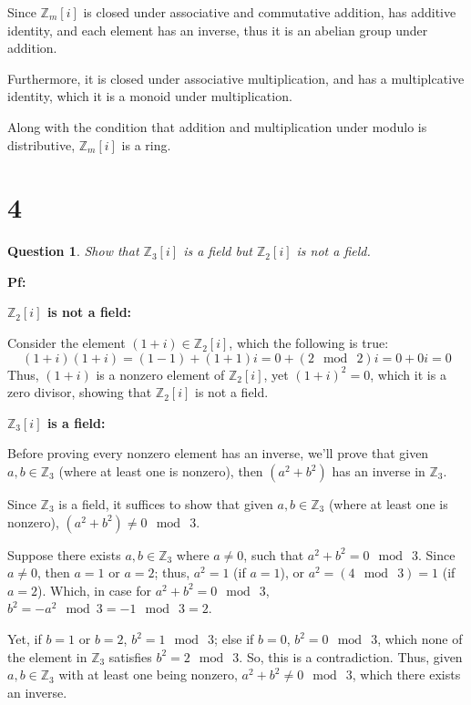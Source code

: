 \documentclass{article}
\newtheorem{question}{Question}
\begin{document}
Since $\mathbb{Z}_m[i]$ is closed under associative and commutative addition, has additive identity, and each element has an inverse,
thus it is an abelian group under addition.

Furthermore, it is closed under associative multiplication, and has a multiplcative identity, which it is a monoid under multiplication.

Along with the condition that addition and multiplication under modulo is distributive, $\mathbb{Z}_m[i]$ is a ring.

\break

\section*{4}
\begin{myBox}[]{}
    \begin{question}
        Show that $\mathbb{Z}_3[i]$ is a field but $\mathbb{Z}_2[i]$ is not a field.
    \end{question}
\end{myBox}

\textbf{Pf:}

\textbf{$\mathbb{Z}_2[i]$ is not a field:}

Consider the element $(1+i)\in \mathbb{Z}_2[i]$, which the following is true:
$$(1+i)(1+i)=(1-1)+(1+1)i = 0+(2\mod\ 2)i = 0+0i = 0$$
Thus, $(1+i)$ is a nonzero element of $\mathbb{Z}_2[i]$, yet $(1+i)^2 = 0$, which it is a zero divisor,
showing that $\mathbb{Z}_2[i]$ is not a field.

\hfill

\textbf{$\mathbb{Z}_3[i]$ is a field:}

Before proving every nonzero element has an inverse, we'll prove that given $a,b\in\mathbb{Z}_3$ (where at least one is nonzero), 
then $(a^2+b^2)$ has an inverse in $\mathbb{Z}_3$.

Since $\mathbb{Z}_3$ is a field, it suffices to show that given $a,b\in\mathbb{Z}_3$ (where at least one is nonzero), $(a^2+b^2)\neq 0 \mod\ 3$.

Suppose there exists $a,b\in\mathbb{Z}_3$ where $a\neq 0$, such that $a^2+b^2=0\mod\ 3$. Since $a\neq 0$, then $a=1$ or $a=2$;
thus, $a^2 = 1$ (if $a=1$), or $a^2=(4\mod\ 3) = 1$ (if $a=2$). 
Which, in case for $a^2+b^2=0\mod\ 3$, $b^2=-a^2\mod 3 = -1\mod\ 3 = 2$.

Yet, if $b=1$ or $b=2$, $b^2=1\mod\ 3$; else if $b=0$, $b^2 = 0\mod\ 3$, which none of the element in $\mathbb{Z}_3$ satisfies
$b^2=2\mod\ 3$. So, this is a contradiction. Thus, given $a,b\in\mathbb{Z}_3$ with at least one being nonzero,
$a^2+b^2 \neq 0\mod\ 3$, which there exists an inverse.
\end{document}
